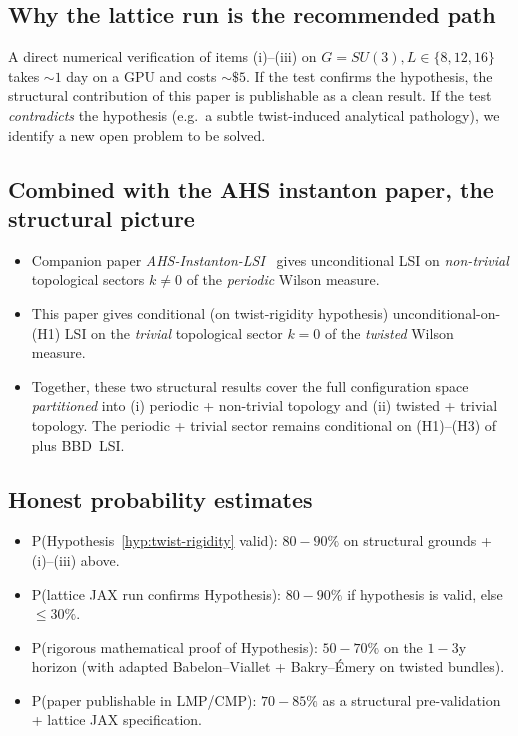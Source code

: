 \documentclass[11pt,a4paper]{amsart}
\theoremstyle{definition}
\begin{document}
\subsection{Why the lattice run is the recommended path}
A direct numerical verification of items (i)--(iii) on
$G = SU(3), L \in \{8,12,16\}$ takes $\sim 1$ day on a GPU and
costs $\sim \$5$. If the test confirms the hypothesis, the structural
contribution of this paper is publishable as a clean result. If the
test \emph{contradicts} the hypothesis (e.g.\ a subtle twist-induced
analytical pathology), we identify a new open problem to be solved.

\subsection{Combined with the AHS instanton paper, the structural picture}
\begin{itemize}[leftmargin=2em]
\item Companion paper \emph{AHS-Instanton-LSI}~\cite{RemondiereAHSInstantonLSI_2026}
gives unconditional LSI on \emph{non-trivial} topological sectors
$k\neq 0$ of the \emph{periodic} Wilson measure.
\item This paper gives conditional (on twist-rigidity hypothesis)
unconditional-on-(H1) LSI on the \emph{trivial} topological sector $k=0$
of the \emph{twisted} Wilson measure.
\item Together, these two structural results cover the full
configuration space \emph{partitioned} into (i) periodic + non-trivial
topology and (ii) twisted + trivial topology. The periodic + trivial
sector remains conditional on (H1)--(H3) of
\cite{RemondiereKRFP3_2026} plus BBD~LSI.
\end{itemize}

\subsection{Honest probability estimates}
\begin{itemize}[leftmargin=2em]
\item P(Hypothesis~\ref{hyp:twist-rigidity} valid): $80-90\%$ on
structural grounds + (i)--(iii) above.
\item P(lattice JAX run confirms Hypothesis): $80-90\%$ if hypothesis
is valid, else $\leq 30\%$.
\item P(rigorous mathematical proof of Hypothesis): $50-70\%$ on the
$1-3$y horizon (with adapted Babelon--Viallet + Bakry--\'Emery on
twisted bundles).
\item P(paper publishable in LMP/CMP): $70-85\%$ as a structural
pre-validation + lattice JAX specification.
\end{itemize}
\end{document}
